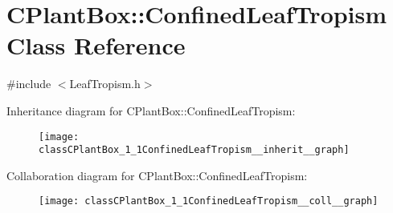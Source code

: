 \hypertarget{classCPlantBox_1_1ConfinedLeafTropism}{}\section{C\+Plant\+Box\+:\+:Confined\+Leaf\+Tropism Class Reference}
\label{classCPlantBox_1_1ConfinedLeafTropism}


{\ttfamily \#include $<$Leaf\+Tropism.\+h$>$}



Inheritance diagram for C\+Plant\+Box\+:\+:Confined\+Leaf\+Tropism\+:\nopagebreak
\begin{figure}[H]
\begin{center}
\leavevmode
\texttt{[image: classCPlantBox\_1\_1ConfinedLeafTropism\_\_inherit\_\_graph]}
\end{center}
\end{figure}


Collaboration diagram for C\+Plant\+Box\+:\+:Confined\+Leaf\+Tropism\+:\nopagebreak
\begin{figure}[H]
\begin{center}
\leavevmode
\texttt{[image: classCPlantBox\_1\_1ConfinedLeafTropism\_\_coll\_\_graph]}
\end{center}
\end{figure}
